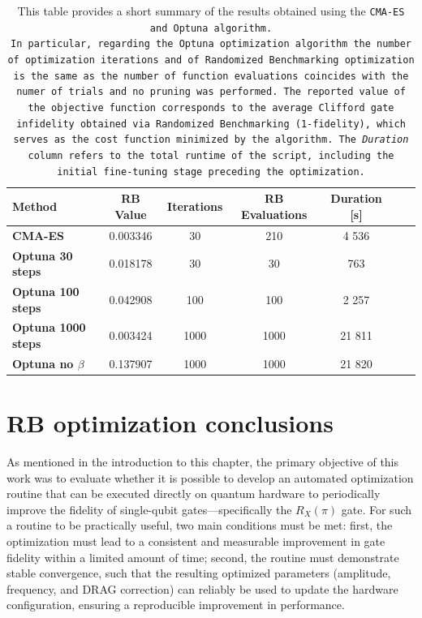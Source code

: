 \begin{table}[h]
    \centering
    \begin{tabular}{lcccccc}
        \toprule
        \textbf{Method} & \textbf{RB Value} & \textbf{Iterations} & \textbf{RB Evaluations} & \textbf{Duration [s]}\\
        \midrule
        \textbf{CMA-ES} & 0.003346 & 30 & 210 & 4 536 \\
        \textbf{Optuna 30 steps} & 0.018178  & 30 & 30 & 763\\
        \textbf{Optuna 100 steps} & 0.042908 & 100 & 100 & 2 257\\
        \textbf{Optuna 1000 steps} & 0.003424 & 1000 & 1000 & 21 811\\
        \textbf{Optuna no $\beta$} & 0.137907 & 1000 & 1000 & 21 820\\
        \bottomrule
    \end{tabular}
    \caption{This table provides a short summary of the results obtained using the \tt{CMA-ES} and \tt{Optuna} algorithm.\\ 
    In particular, regarding the \tt{Optuna} optimization algorithm the number of optimization iterations and of Randomized Benchmarking optimization is the same as the number of function evaluations coincides with the numer of trials and no pruning was performed.
    The reported value of the objective function corresponds to the average Clifford gate infidelity obtained via Randomized Benchmarking (1-fidelity), which serves as the cost function minimized by the algorithm.
    The \textit{Duration} column refers to the total runtime of the script, including the initial fine-tuning stage preceding the optimization.\\}
    \label{tab:optuna_opt}
\end{table}

\section{RB optimization conclusions}
As mentioned in the introduction to this chapter, the primary objective of this work was to evaluate whether it is possible to develop an automated optimization routine that can be executed directly on quantum hardware to periodically improve the fidelity of single-qubit gates—specifically the  $R_X(\pi)$ gate. 
For such a routine to be practically useful, two main conditions must be met: first, the optimization must lead to a consistent and measurable improvement in gate fidelity within a limited amount of time; 
second, the routine must demonstrate stable convergence, such that the resulting optimized parameters (amplitude, frequency, and DRAG correction) can reliably be used to update the hardware configuration, ensuring a reproducible improvement in performance.

